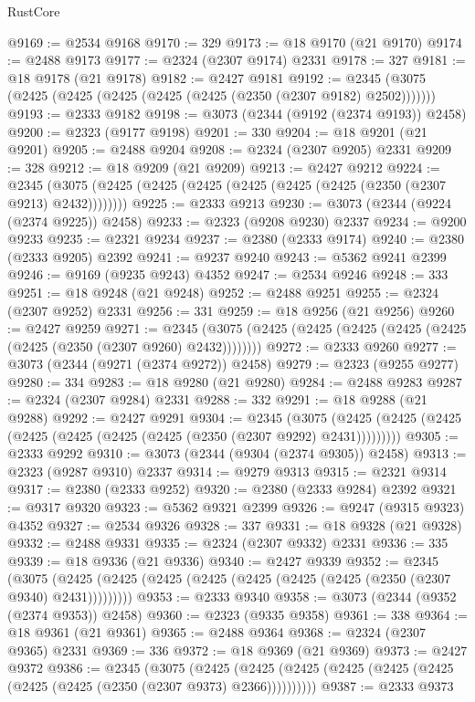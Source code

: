 \begin{lexlean}{RustCore}
\begin{coremodule}
@9169 := @2534 @9168
@9170 := 329
@9173 := @18 @9170 (@21 @9170)
@9174 := @2488 @9173
@9177 := @2324 (@2307 @9174) @2331
@9178 := 327
@9181 := @18 @9178 (@21 @9178)
@9182 := @2427 @9181
@9192 := @2345 (@3075 (@2425 (@2425 (@2425 (@2425 (@2425 (@2350 (@2307 @9182) @2502)))))))
@9193 := @2333 @9182
@9198 := @3073 (@2344 (@9192 (@2374 @9193)) @2458)
@9200 := @2323 (@9177 @9198)
@9201 := 330
@9204 := @18 @9201 (@21 @9201)
@9205 := @2488 @9204
@9208 := @2324 (@2307 @9205) @2331
@9209 := 328
@9212 := @18 @9209 (@21 @9209)
@9213 := @2427 @9212
@9224 := @2345 (@3075 (@2425 (@2425 (@2425 (@2425 (@2425 (@2425 (@2350 (@2307 @9213) @2432))))))))
@9225 := @2333 @9213
@9230 := @3073 (@2344 (@9224 (@2374 @9225)) @2458)
@9233 := @2323 (@9208 @9230) @2337
@9234 := @9200 @9233
@9235 := @2321 @9234
@9237 := @2380 (@2333 @9174)
@9240 := @2380 (@2333 @9205) @2392
@9241 := @9237 @9240
@9243 := @5362 @9241 @2399
@9246 := @9169 (@9235 @9243) @4352
@9247 := @2534 @9246
@9248 := 333
@9251 := @18 @9248 (@21 @9248)
@9252 := @2488 @9251
@9255 := @2324 (@2307 @9252) @2331
@9256 := 331
@9259 := @18 @9256 (@21 @9256)
@9260 := @2427 @9259
@9271 := @2345 (@3075 (@2425 (@2425 (@2425 (@2425 (@2425 (@2425 (@2350 (@2307 @9260) @2432))))))))
@9272 := @2333 @9260
@9277 := @3073 (@2344 (@9271 (@2374 @9272)) @2458)
@9279 := @2323 (@9255 @9277)
@9280 := 334
@9283 := @18 @9280 (@21 @9280)
@9284 := @2488 @9283
@9287 := @2324 (@2307 @9284) @2331
@9288 := 332
@9291 := @18 @9288 (@21 @9288)
@9292 := @2427 @9291
@9304 := @2345
    (@3075 (@2425 (@2425 (@2425 (@2425 (@2425 (@2425 (@2425 (@2350 (@2307 @9292) @2431)))))))))
@9305 := @2333 @9292
@9310 := @3073 (@2344 (@9304 (@2374 @9305)) @2458)
@9313 := @2323 (@9287 @9310) @2337
@9314 := @9279 @9313
@9315 := @2321 @9314
@9317 := @2380 (@2333 @9252)
@9320 := @2380 (@2333 @9284) @2392
@9321 := @9317 @9320
@9323 := @5362 @9321 @2399
@9326 := @9247 (@9315 @9323) @4352
@9327 := @2534 @9326
@9328 := 337
@9331 := @18 @9328 (@21 @9328)
@9332 := @2488 @9331
@9335 := @2324 (@2307 @9332) @2331
@9336 := 335
@9339 := @18 @9336 (@21 @9336)
@9340 := @2427 @9339
@9352 := @2345
    (@3075 (@2425 (@2425 (@2425 (@2425 (@2425 (@2425 (@2425 (@2350 (@2307 @9340) @2431)))))))))
@9353 := @2333 @9340
@9358 := @3073 (@2344 (@9352 (@2374 @9353)) @2458)
@9360 := @2323 (@9335 @9358)
@9361 := 338
@9364 := @18 @9361 (@21 @9361)
@9365 := @2488 @9364
@9368 := @2324 (@2307 @9365) @2331
@9369 := 336
@9372 := @18 @9369 (@21 @9369)
@9373 := @2427 @9372
@9386 := @2345
    (@3075
      (@2425 (@2425 (@2425 (@2425 (@2425 (@2425 (@2425 (@2425 (@2350 (@2307 @9373) @2366))))))))))
@9387 := @2333 @9373

\end{coremodule}
\end{lexlean}

